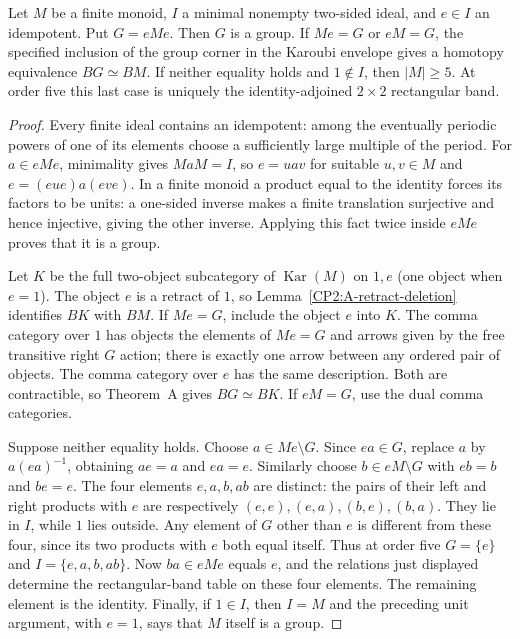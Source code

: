 \begin{lemma}
\label{CP2:A-small-minimal-ideal}
Let $M$ be a finite monoid, $I$ a minimal nonempty two-sided ideal,
and $e\in I$ an idempotent. Put $G=eMe$. Then $G$ is a group.
If $Me=G$ or $eM=G$, the specified inclusion of the group corner in
the Karoubi envelope gives a homotopy equivalence $BG\simeq BM$.
If neither equality holds and $1\notin I$, then $|M|\ge5$.
At order five this last case is uniquely the identity-adjoined
$2\times2$ rectangular band.
\end{lemma}
\begin{proof}
Every finite ideal contains an idempotent: among the eventually
periodic powers of one of its elements choose a sufficiently large
multiple of the period. For $a\in eMe$, minimality gives $MaM=I$,
so $e=uav$ for suitable $u,v\in M$ and
$e=(eue)a(eve)$. In a finite monoid a product equal to the identity
forces its factors to be units: a one-sided inverse makes a finite
translation surjective and hence injective, giving the other
inverse. Applying this fact twice inside $eMe$ proves that it is a
group.

Let $K$ be the full two-object subcategory of $\operatorname{Kar}(M)$
on $1,e$ (one object when $e=1$). The object $e$ is a retract of $1$,
so Lemma~\ref{CP2:A-retract-deletion} identifies $BK$ with $BM$.
If $Me=G$, include the object $e$ into $K$. The comma category over
$1$ has objects the elements of $Me=G$ and arrows given by the free
transitive right $G$ action; there is exactly one arrow between
any ordered pair of objects. The comma category over $e$ has the
same description. Both are contractible, so Theorem~A gives
$BG\simeq BK$. If $eM=G$, use the dual comma categories.

Suppose neither equality holds. Choose $a\in Me\setminus G$.
Since $ea\in G$, replace $a$ by $a(ea)^{-1}$, obtaining
$ae=a$ and $ea=e$. Similarly choose $b\in eM\setminus G$ with
$eb=b$ and $be=e$. The four elements $e,a,b,ab$ are distinct:
the pairs of their left and right products with $e$ are respectively
$(e,e),(e,a),(b,e),(b,a)$. They lie in $I$, while $1$ lies outside.
Any element of $G$ other than $e$ is different from these four, since
its two products with $e$ both equal itself. Thus at order five
$G=\{e\}$ and $I=\{e,a,b,ab\}$. Now $ba\in eMe$ equals $e$,
and the relations just displayed determine the rectangular-band
table on these four elements. The remaining element is the
identity. Finally, if $1\in I$, then $I=M$ and the preceding
unit argument, with $e=1$, says that $M$ itself is a group.
\end{proof}

